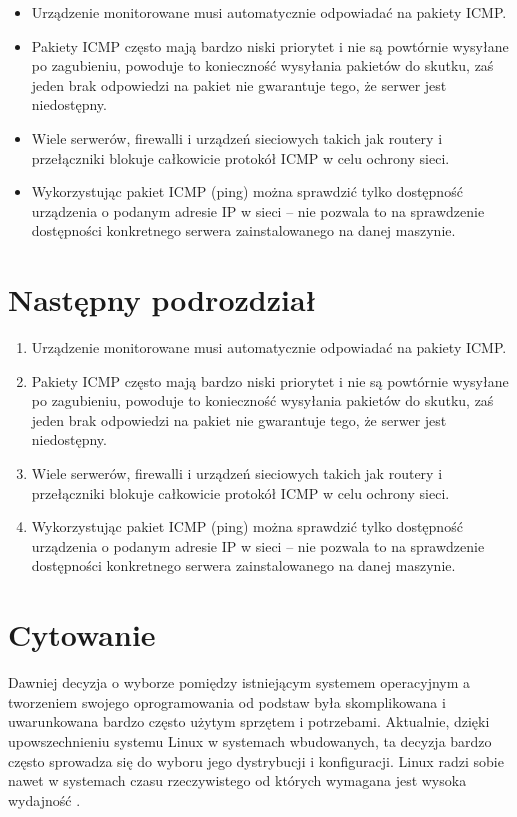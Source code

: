 \begin{itemize}
	\item Urządzenie monitorowane musi automatycznie odpowiadać na pakiety ICMP.
	\item Pakiety ICMP często mają bardzo niski priorytet i nie są powtórnie wysyłane po zagubieniu, powoduje to konieczność wysyłania pakietów do skutku, zaś jeden brak odpowiedzi na pakiet nie gwarantuje tego, że serwer jest niedostępny.
	\item Wiele serwerów, firewalli i urządzeń sieciowych takich jak routery i przełączniki blokuje całkowicie protokół ICMP w celu ochrony sieci.
	\item Wykorzystując pakiet ICMP (ping) można sprawdzić tylko dostępność urządzenia o podanym adresie IP w sieci – nie pozwala to na sprawdzenie dostępności konkretnego serwera zainstalowanego na danej maszynie.
\end{itemize}

\section{Następny podrozdział}

\begin{enumerate}
	\item Urządzenie monitorowane musi automatycznie odpowiadać na pakiety ICMP.
	\item Pakiety ICMP często mają bardzo niski priorytet i nie są powtórnie wysyłane po zagubieniu, powoduje to konieczność wysyłania pakietów do skutku, zaś jeden brak odpowiedzi na pakiet nie gwarantuje tego, że serwer jest niedostępny.
	\item Wiele serwerów, firewalli i urządzeń sieciowych takich jak routery i przełączniki blokuje całkowicie protokół ICMP w celu ochrony sieci.
	\item Wykorzystując pakiet ICMP (ping) można sprawdzić tylko dostępność urządzenia o podanym adresie IP w sieci – nie pozwala to na sprawdzenie dostępności konkretnego serwera zainstalowanego na danej maszynie.
\end{enumerate}

\section{Cytowanie}

Dawniej decyzja o wyborze pomiędzy istniejącym systemem operacyjnym a tworzeniem swojego oprogramowania od podstaw była skomplikowana i uwarunkowana bardzo często użytym sprzętem i potrzebami. Aktualnie, dzięki upowszechnieniu systemu Linux w systemach wbudowanych, ta decyzja bardzo często sprowadza się do wyboru jego dystrybucji i konfiguracji. Linux radzi sobie nawet w systemach czasu rzeczywistego od których wymagana jest wysoka wydajność \cite{ProLinuxEmbedded, AnalysisAndSynthesis}.
